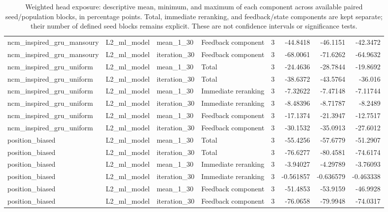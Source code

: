 \begin{table}[htbp!]
\begin{tabular}{llllrrrr}
ncm\_inspired\_gru\_mansoury & L2\_ml\_model & mean\_1\_30 & Feedback component & 3 & -44.8418 & -46.1151 & -42.3472 \\
ncm\_inspired\_gru\_mansoury & L2\_ml\_model & iteration\_30 & Feedback component & 3 & -68.0061 & -71.6262 & -64.9632 \\
ncm\_inspired\_gru\_uniform & L2\_ml\_model & mean\_1\_30 & Total & 3 & -24.4636 & -28.7844 & -19.8692 \\
ncm\_inspired\_gru\_uniform & L2\_ml\_model & iteration\_30 & Total & 3 & -38.6372 & -43.5764 & -36.016 \\
ncm\_inspired\_gru\_uniform & L2\_ml\_model & mean\_1\_30 & Immediate reranking & 3 & -7.32622 & -7.47148 & -7.11744 \\
ncm\_inspired\_gru\_uniform & L2\_ml\_model & iteration\_30 & Immediate reranking & 3 & -8.48396 & -8.71787 & -8.2489 \\
ncm\_inspired\_gru\_uniform & L2\_ml\_model & mean\_1\_30 & Feedback component & 3 & -17.1374 & -21.3947 & -12.7517 \\
ncm\_inspired\_gru\_uniform & L2\_ml\_model & iteration\_30 & Feedback component & 3 & -30.1532 & -35.0913 & -27.6012 \\
position\_biased & L2\_ml\_model & mean\_1\_30 & Total & 3 & -55.4256 & -57.6779 & -51.2907 \\
position\_biased & L2\_ml\_model & iteration\_30 & Total & 3 & -76.6277 & -80.4581 & -74.6174 \\
position\_biased & L2\_ml\_model & mean\_1\_30 & Immediate reranking & 3 & -3.94027 & -4.29789 & -3.76093 \\
position\_biased & L2\_ml\_model & iteration\_30 & Immediate reranking & 3 & -0.561857 & -0.636579 & -0.463338 \\
position\_biased & L2\_ml\_model & mean\_1\_30 & Feedback component & 3 & -51.4853 & -53.9159 & -46.9928 \\
position\_biased & L2\_ml\_model & iteration\_30 & Feedback component & 3 & -76.0658 & -79.9948 & -74.0317 \\
\hline
\end{tabular}
\caption{Weighted head exposure: descriptive mean, minimum, and maximum of each component across available paired seed/population blocks, in percentage points. Total, immediate reranking, and feedback/state components are kept separate; their number of defined seed blocks remains explicit. These are not confidence intervals or significance tests.}
\label{chap:results:tab:rq4_post_processing_weighted_head_exposure_component_seed_consistency}
\end{table}
